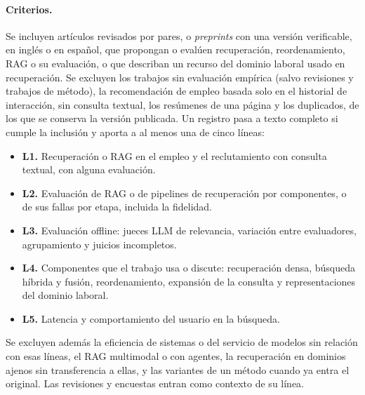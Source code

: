 \paragraph{Criterios.} Se incluyen artículos revisados por pares, o \textit{preprints} con una versión verificable, en inglés o en español, que propongan o evalúen recuperación, reordenamiento, RAG o su evaluación, o que describan un recurso del dominio laboral usado en recuperación. Se excluyen los trabajos sin evaluación empírica (salvo revisiones y trabajos de método), la recomendación de empleo basada solo en el historial de interacción, sin consulta textual, los resúmenes de una página y los duplicados, de los que se conserva la versión publicada. Un registro pasa a texto completo si cumple la inclusión y aporta a al menos una de cinco líneas:
\begin{itemize}
    \item \textbf{L1.} Recuperación o RAG en el empleo y el reclutamiento con consulta textual, con alguna evaluación.
    \item \textbf{L2.} Evaluación de RAG o de pipelines de recuperación por componentes, o de sus fallas por etapa, incluida la fidelidad.
    \item \textbf{L3.} Evaluación offline: jueces LLM de relevancia, variación entre evaluadores, agrupamiento y juicios incompletos.
    \item \textbf{L4.} Componentes que el trabajo usa o discute: recuperación densa, búsqueda híbrida y fusión, reordenamiento, expansión de la consulta y representaciones del dominio laboral.
    \item \textbf{L5.} Latencia y comportamiento del usuario en la búsqueda.
\end{itemize}
Se excluyen además la eficiencia de sistemas o del servicio de modelos sin relación con esas líneas, el RAG multimodal o con agentes, la recuperación en dominios ajenos sin transferencia a ellas, y las variantes de un método cuando ya entra el original. Las revisiones y encuestas entran como contexto de su línea.


